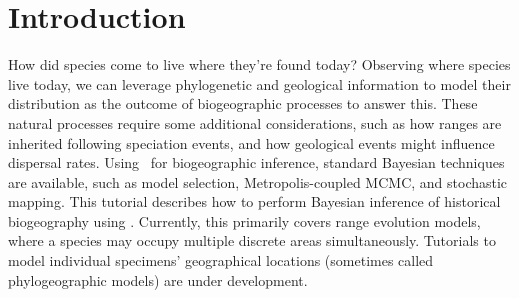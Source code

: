 \section{Introduction}

How did species come to live where they're found today?
Observing where species live today, we can leverage phylogenetic and geological information to model their distribution as the outcome of biogeographic processes to answer this.
These natural processes require some additional considerations, such as how ranges are inherited following speciation events, and how geological events might influence dispersal rates.
Using \RevBayes~for biogeographic inference, standard Bayesian techniques are available, such as model selection, Metropolis-coupled MCMC, and stochastic mapping.
This tutorial describes how to perform Bayesian inference of historical biogeography using \RevBayes. 
Currently, this primarily covers range evolution models, where a species may occupy multiple discrete areas simultaneously.
Tutorials to model individual specimens' geographical locations (sometimes called phylogeographic models) are under development.
%
%
%
%
%
%
%
%
%
%

%

%

